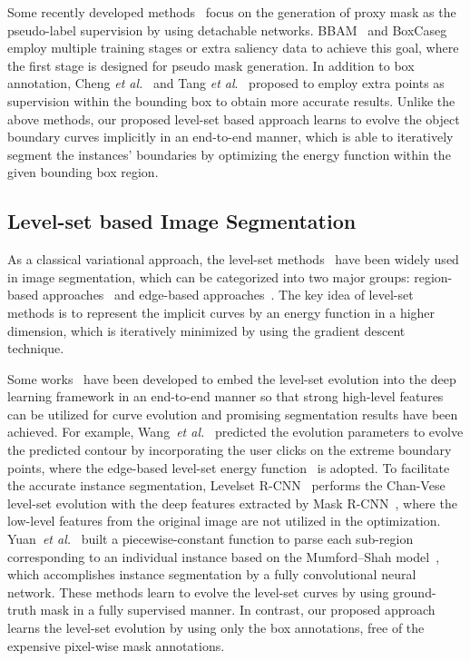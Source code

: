 \documentclass[12pt,onecolumn,letterpaper]{article}
\begin{document}
Some recently developed methods~\cite{cvpr2021bbam, cvpr2021boxcaseg} focus on the generation of proxy mask as the pseudo-label supervision by using detachable networks. BBAM~\cite{cvpr2021bbam} and BoxCaseg~\cite{cvpr2021boxcaseg} employ multiple training stages or extra saliency data to achieve this goal, where the first stage is designed for pseudo mask generation. In addition to box annotation, Cheng \textit{et al.}~\cite{cvpr2022pointly} and Tang \textit{et al}.~\cite{tang2022active} proposed to employ extra points as supervision within the bounding box to obtain more accurate results.
Unlike the above methods, our proposed level-set based approach learns to evolve the object boundary curves implicitly in an end-to-end manner, which is able to iteratively segment the instances' boundaries by optimizing the energy function within the given bounding box region.


\subsection{Level-set based Image Segmentation}
As a classical variational approach, the level-set methods~\cite{levelset1995a, osher1988fronts} have been widely used in image segmentation, which can be categorized into two major groups: region-based approaches~\cite{tip2001_active_contour, ijcv2002multiphase, mumford1989optimal} and edge-based approaches~\cite{ijcv1997geodesic, tpami1995shape}. The key idea of level-set methods is to represent the implicit curves by an energy function in a higher dimension, which is iteratively minimized by using the gradient descent technique. 

Some works~\cite{eccv2020levelset,tip2019mumford, CVPR2017hudeep,cvpr2019deeplevelsetevolution,yuan2020deep} have been developed to embed the level-set evolution into the deep learning framework in an end-to-end manner so that strong high-level features can be utilized for curve evolution and promising segmentation results have been achieved. For example, 
Wang~\textit{et al.}~\cite{cvpr2019deeplevelsetevolution} predicted the evolution parameters to evolve the predicted contour by incorporating the user clicks on the extreme boundary points, where the edge-based level-set energy function~\cite{ijcv1997geodesic} is adopted. To facilitate the accurate instance segmentation, Levelset R-CNN~\cite{eccv2020levelset} performs the Chan-Vese level-set evolution with the deep features extracted by Mask R-CNN~\cite{iccv2017maskrcnn}, where the low-level features from the original image are not utilized in the optimization.
Yuan~\textit{et al.}~\cite{yuan2020deep} built a piecewise-constant function to parse each sub-region corresponding to an individual instance based on the Mumford–Shah model~\cite{mumford1989optimal}, which accomplishes instance segmentation by a fully convolutional neural network. These methods learn to evolve the level-set curves by using ground-truth mask in a fully supervised manner. In contrast, our proposed approach learns the level-set evolution by  using only the box annotations, free of the expensive pixel-wise mask annotations. 
\end{document}
